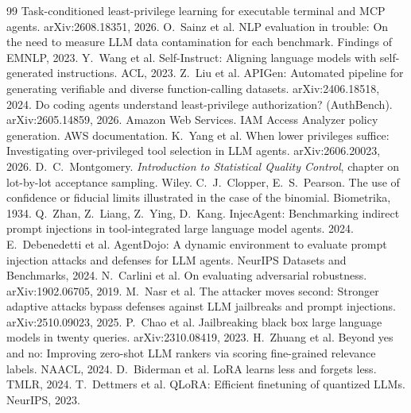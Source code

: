 \documentclass[10pt]{article}
\begin{document}
\begin{thebibliography}{99}\small
{} Task-conditioned least-privilege learning for executable terminal and MCP agents. arXiv:2608.18351, 2026.
 O.~Sainz et al. NLP evaluation in trouble: On the need to measure LLM data contamination for each benchmark. Findings of EMNLP, 2023.
 Y.~Wang et al. Self-Instruct: Aligning language models with self-generated instructions. ACL, 2023.
 Z.~Liu et al. APIGen: Automated pipeline for generating verifiable and diverse function-calling datasets. arXiv:2406.18518, 2024.
 Do coding agents understand least-privilege authorization? (AuthBench). arXiv:2605.14859, 2026.
 Amazon Web Services. IAM Access Analyzer policy generation. AWS documentation.
 K.~Yang et al. When lower privileges suffice: Investigating over-privileged tool selection in LLM agents. arXiv:2606.20023, 2026.
 D.~C.~Montgomery. \emph{Introduction to Statistical Quality Control}, chapter on lot-by-lot acceptance sampling. Wiley.
 C.~J.~Clopper, E.~S.~Pearson. The use of confidence or fiducial limits illustrated in the case of the binomial. Biometrika, 1934.
 Q.~Zhan, Z.~Liang, Z.~Ying, D.~Kang. InjecAgent: Benchmarking indirect prompt injections in tool-integrated large language model agents. 2024.
 E.~Debenedetti et al. AgentDojo: A dynamic environment to evaluate prompt injection attacks and defenses for LLM agents. NeurIPS Datasets and Benchmarks, 2024.
 N.~Carlini et al. On evaluating adversarial robustness. arXiv:1902.06705, 2019.
 M.~Nasr et al. The attacker moves second: Stronger adaptive attacks bypass defenses against LLM jailbreaks and prompt injections. arXiv:2510.09023, 2025.
 P.~Chao et al. Jailbreaking black box large language models in twenty queries. arXiv:2310.08419, 2023.
 H.~Zhuang et al. Beyond yes and no: Improving zero-shot LLM rankers via scoring fine-grained relevance labels. NAACL, 2024.
 D.~Biderman et al. LoRA learns less and forgets less. TMLR, 2024.
 T.~Dettmers et al. QLoRA: Efficient finetuning of quantized LLMs. NeurIPS, 2023.
\end{thebibliography}
\end{document}
